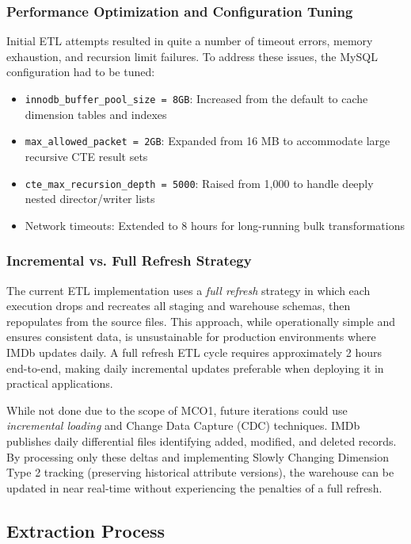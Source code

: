 \subsubsection{Performance Optimization and Configuration Tuning}

Initial ETL attempts resulted in quite a number of timeout errors, memory exhaustion, and recursion limit failures. To address these issues, the MySQL configuration had to be tuned:

\begin{itemize}
    \item \texttt{innodb\_buffer\_pool\_size = 8GB}: Increased from the default to cache dimension tables and indexes
    \item \texttt{max\_allowed\_packet = 2GB}: Expanded from 16 MB to accommodate large recursive CTE result sets
    \item \texttt{cte\_max\_recursion\_depth = 5000}: Raised from 1,000 to handle deeply nested director/writer lists
    \item Network timeouts: Extended to 8 hours for long-running bulk transformations
\end{itemize}

\subsubsection{Incremental vs. Full Refresh Strategy}

The current ETL implementation uses a \textit{full refresh} strategy in which each execution drops and recreates all staging and warehouse schemas, then repopulates from the source files. This approach, while operationally simple and ensures consistent data, is unsustainable for production environments where IMDb updates daily. A full refresh ETL cycle requires approximately 2 hours end-to-end, making daily incremental updates preferable when deploying it in practical applications.

While not done due to the scope of MCO1, future iterations could use \textit{incremental loading} and Change Data Capture (CDC) techniques. IMDb publishes daily differential files identifying added, modified, and deleted records. By processing only these deltas and implementing Slowly Changing Dimension Type 2 tracking (preserving historical attribute versions), the warehouse can be updated in near real-time without experiencing the penalties of a full refresh.

\subsection{Extraction Process}

